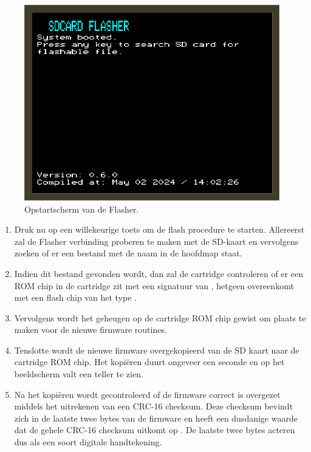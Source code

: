 \begin{figure}[h!]
    \centering
    \includegraphics[width=0.99\textwidth]{img/flasher_boot.png}
    \caption{Opstartscherm van de Flasher.}
    \label{fig:flasher-boot}
\end{figure}

\begin{enumerate}
    \item Druk nu op een willekeurige toets om de flash procedure te starten. Allereerst zal de Flasher verbinding proberen te maken met de SD-kaart en vervolgens zoeken of er een bestand met de naam  in de hoofdmap staat. 
    \item Indien dit bestand gevonden wordt, dan zal de cartridge controleren of er een ROM chip in de cartridge zit met een signatuur van , hetgeen overeenkomt met een flash chip van het type .
    \item Vervolgens wordt het geheugen  op de cartridge ROM chip gewist om plaats te maken voor de nieuwe firmware routines.
    \item Tenslotte wordt de nieuwe firmware overgekopieerd van de SD kaart naar de cartridge ROM chip. Het kopiëren duurt ongeveer een seconde en op het beeldscherm valt een teller te zien.
    \item Na het kopiëren wordt gecontroleerd of de firmware correct is overgezet middels het uitrekenen van een CRC-16 checksum. Deze checksum bevindt zich in de laatste twee bytes van de firmware en heeft een dusdanige waarde dat de gehele CRC-16 checksum uitkomt op . De laatste twee bytes acteren dus als een soort digitale handtekening.    
\end{enumerate}

